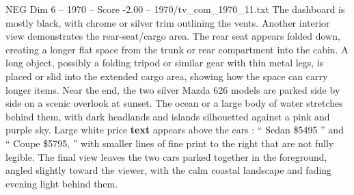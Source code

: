 \begin{textsample}{NEG Dim 6 – 1970 – Score -2.00 – 1970/tv\_com\_1970\_11.txt}
The dashboard is mostly black, with chrome or silver trim outlining the vents.
Another interior view demonstrates the rear-seat/cargo area.
The rear seat appears folded down, creating a longer flat space from the trunk or rear compartment into the cabin.
A long object, possibly a folding tripod or similar gear with thin metal legs, is placed or slid into the extended cargo area, showing how the space can carry longer items.
Near the end, the two silver Mazda 626 models are parked side by side on a scenic overlook at sunset.
The ocean or a large body of water stretches behind them, with dark headlands and islands silhouetted against a pink and purple sky.
Large white price \textbf{text} appears above the cars : “ Sedan \$5495 ” and “ Coupe \$5795, ” with smaller lines of fine print to the right that are not fully legible.
The final view leaves the two cars parked together in the foreground, angled slightly toward the viewer, with the calm coastal landscape and fading evening light behind them.

\end{textsample}
